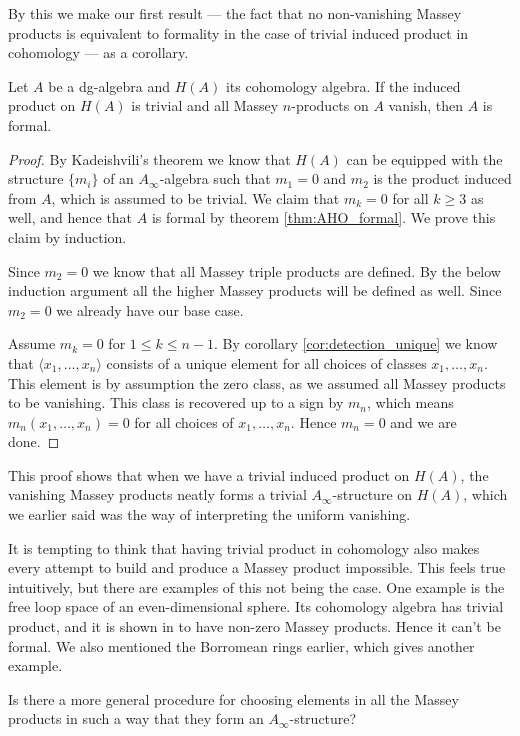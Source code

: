 By this we make our first result — the fact that no non-vanishing Massey products is 
equivalent to formality in the case of trivial induced product in cohomology — as a 
corollary. 

\begin{corollary}
    Let $A$ be a dg-algebra and $H(A)$ its cohomology algebra. If the induced product on 
    $H(A)$ is trivial and all Massey $n$-products on $A$ vanish, then $A$ is formal.        
\end{corollary}

\begin{proof}
    By Kadeishvili's theorem we know that $H(A)$ can be equipped with the structure 
    $\{m_i\}$ of an $A_\infty$-algebra such that $m_1=0$ and $m_2$ is the product induced 
    from $A$, which is assumed to be trivial. We claim that $m_k = 0$ for all $k\geq 3$ 
    as well, and hence that $A$ is formal by theorem \ref{thm:AHO_formal}. We prove this 
    claim by induction. 
    
    Since $m_2=0$ we know that all Massey triple products are defined. By the below 
    induction argument all the higher Massey products will be defined as well. Since 
    $m_2=0$ we already have our base case.
    
    Assume $m_k = 0$ for $1\leq k\leq n-1$. By corollary \ref{cor:detection_unique} we know 
    that $\langle x_1, \ldots, x_n \rangle$ consists of a unique element for all choices of 
    classes $x_1, \ldots, x_n$. This element is by assumption the zero class, as we assumed 
    all Massey products to be vanishing. This class is recovered up to a sign by $m_n$, 
    which means $m_n(x_1,\ldots, x_n)=0$ for all choices of $x_1, \ldots, x_n$. Hence 
    $m_n=0$ and we are done. 
\end{proof}

This proof shows that when we have a trivial induced product on $H(A)$, the vanishing 
Massey products neatly forms a trivial $A_\infty$-structure on $H(A)$, which we earlier 
said was the way of interpreting the uniform vanishing.

It is tempting to think that having trivial product in cohomology also makes every attempt 
to build and produce a Massey product impossible. This feels true intuitively, but there 
are examples of this not being the case. One example is the free loop space of an 
even-dimensional sphere. Its cohomology algebra has trivial product, and it is shown in 
\cite{nonformal_loop} to have non-zero Massey products. Hence it can't be formal. We also 
mentioned the Borromean rings earlier, which gives another example. 

\begin{question}
Is there a more general procedure for choosing elements in all the Massey 
products in such a way that they form an $A_\infty$-structure?
\end{question}